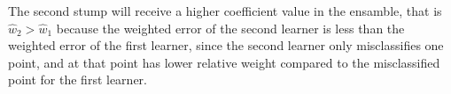 \begin{answer}
The second stump will receive a higher coefficient value in the ensamble, that is $\hat{w}_2 > \hat{w}_1$ because the weighted error of the second learner is less than the weighted error of the first learner, since the second learner only misclassifies one point, and at that point has lower relative weight compared to the misclassified point for the first learner.
\end{answer}